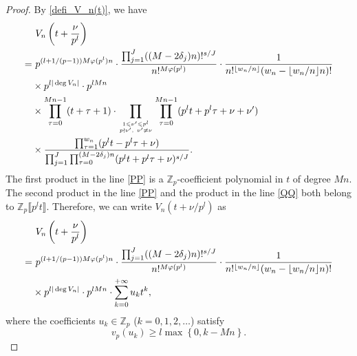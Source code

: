\documentclass[12pt]{article}
\numberwithin{equation}{section}
\begin{document}
\begin{proof}
By \eqref{defi_V_n(t)}, we have
\begin{align}
&~ V_n\left(t+\frac{\nu}{p^l}\right) \notag\\
=&~ p^{(l+1/(p-1))M\varphi(p^{l})n} \cdot \frac{\prod_{j=1}^{J} ((M-2\delta_j)n)!^{s/J}}{n!^{M\varphi(p^{l})}} \cdot \frac{1}{n!^{\lfloor w_n / n\rfloor}(w_n-\lfloor w_n / n\rfloor n)!} \notag \\
&\times p^{l|\deg V_n|} \cdot p^{lMn} \notag\\
&\times \prod_{\tau=0}^{Mn-1} (t+\tau+1) \cdot  \prod_{1 \leqslant \nu^{\prime} \leqslant p^{l} \atop p \nmid \nu^{\prime},~\nu^{\prime}\neq \nu}\prod_{\tau=0}^{Mn-1} (p^lt+p^{l}\tau+\nu+\nu^{\prime}) \label{PP}\\
&\times
\frac{\prod_{\tau=1}^{w_n}(p^{l}t-p^{l}\tau+\nu)}{\prod_{j=1}^{J}\prod_{\tau=0}^{(M-2\delta_j)n}(p^{l}t+p^{l}\tau+\nu)^{s/J}}. \label{QQ}
\end{align}
The first product in the line \eqref{PP} is a $\mathbb{Z}_p$-coefficient polynomial in $t$ of degree $Mn$. The second product in the line \eqref{PP} and the product in the line \eqref{QQ} both belong to $\mathbb{Z}_p\llbracket p^{l}t \rrbracket$. Therefore, we can write $V_n(t+\nu/p^l)$ as
\begin{align}
&~ V_n\left(t+\frac{\nu}{p^l}\right) \notag\\
=&~ p^{(l+1/(p-1))M\varphi(p^{l})n} \cdot \frac{\prod_{j=1}^{J} ((M-2\delta_j)n)!^{s/J}}{n!^{M\varphi(p^{l})}} \cdot \frac{1}{n!^{\lfloor w_n / n\rfloor}(w_n-\lfloor w_n / n\rfloor n)!} \notag \\
&\times p^{l|\deg V_n|} \cdot p^{lMn} \cdot \sum_{k=0}^{+\infty} u_kt^{k},  \label{expression_for_Vn(shift)}
\end{align}
where the coefficients $u_k \in \mathbb{Z}_p$ ($k=0,1,2,\ldots$) satisfy
\begin{equation}\label{v_p(u_k)>}
	v_p(u_k) \geqslant l\max\left\{ 0, k -Mn \right\}.
\end{equation}


\end{proof}
\end{document}
